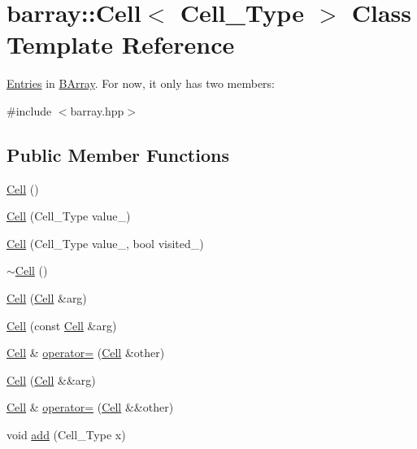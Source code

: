 \hypertarget{classbarray_1_1_cell}{}\section{barray\+:\+:Cell$<$ Cell\+\_\+\+Type $>$ Class Template Reference}
\label{classbarray_1_1_cell}


\hyperlink{classbarray_1_1_entries}{Entries} in \hyperlink{classbarray_1_1_b_array}{B\+Array}. For now, it only has two members\+:  




{\ttfamily \#include $<$barray.\+hpp$>$}

\subsection*{Public Member Functions}
\begin{DoxyCompactItemize}
\item 
\hyperlink{classbarray_1_1_cell_acf29dd46bea3281d9749ee9db8b582a2}{Cell} ()
\item 
\hyperlink{classbarray_1_1_cell_a87140a0f48bebf40f5b78fed71e16494}{Cell} (Cell\+\_\+\+Type value\+\_\+)
\item 
\hyperlink{classbarray_1_1_cell_af3b0a20d0f83e48635840e0e184274c1}{Cell} (Cell\+\_\+\+Type value\+\_\+, bool visited\+\_\+)
\item 
\hyperlink{classbarray_1_1_cell_a8094605818f0e830b96f6387720ce121}{$\sim$\+Cell} ()
\item 
\hyperlink{classbarray_1_1_cell_aa86466ea836b425461c0b8ab5b785bc0}{Cell} (\hyperlink{classbarray_1_1_cell}{Cell} \&arg)
\item 
\hyperlink{classbarray_1_1_cell_aedb8cec82e7940182532da7e0d199bc7}{Cell} (const \hyperlink{classbarray_1_1_cell}{Cell} \&arg)
\item 
\hyperlink{classbarray_1_1_cell}{Cell} \& \hyperlink{classbarray_1_1_cell_a728519773feadec5fec6fb0606642552}{operator=} (\hyperlink{classbarray_1_1_cell}{Cell} \&other)
\item 
\hyperlink{classbarray_1_1_cell_a1882c43e6e545687938c324eeebd6c89}{Cell} (\hyperlink{classbarray_1_1_cell}{Cell} \&\&arg)
\item 
\hyperlink{classbarray_1_1_cell}{Cell} \& \hyperlink{classbarray_1_1_cell_aefdd2fc72a23ea6550cfee17746ed174}{operator=} (\hyperlink{classbarray_1_1_cell}{Cell} \&\&other)
\item 
void \hyperlink{classbarray_1_1_cell_ac6bc03bcee187b59b1f97e55d2be9e84}{add} (Cell\+\_\+\+Type x)
\end{DoxyCompactItemize}
